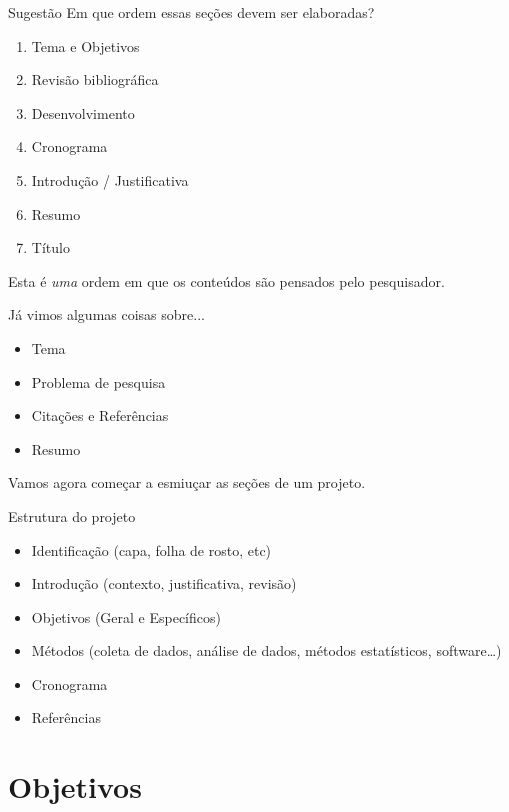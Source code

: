 \documentclass{beamer}
\begin{document}
\begin{frame}{Sugestão}
Em que ordem essas seções devem ser elaboradas?
\begin{enumerate}
\item Tema e Objetivos
\item Revisão bibliográfica
\item Desenvolvimento
\item Cronograma
\item Introdução / Justificativa
\item Resumo
\item Título
\end{enumerate}

\vfill
Esta é {\em uma} ordem em que os conteúdos são pensados pelo pesquisador.

\end{frame}

\begin{frame}{Já vimos algumas coisas sobre...}
  \begin{itemize}
  \item<1-> Tema
  \item<1-> Problema de pesquisa
  \item<1-> Citações e Referências
  \item<1-> Resumo
  \end{itemize}

  Vamos agora começar a esmiuçar as seções de um projeto.
\end{frame}

\begin{frame}{Estrutura do projeto}
  \begin{itemize}
  \item<1-> Identificação (capa, folha de rosto, etc)
  \item<1-> Introdução (contexto, justificativa, revisão)
  \item<1-> Objetivos (Geral e Específicos)
  \item<1-> Métodos (coleta de dados, análise de dados, métodos estatísticos, software\ldots)
  \item<1-> Cronograma
  \item<1-> Referências
  \end{itemize}
\end{frame}

\section{Objetivos}
\end{document}

